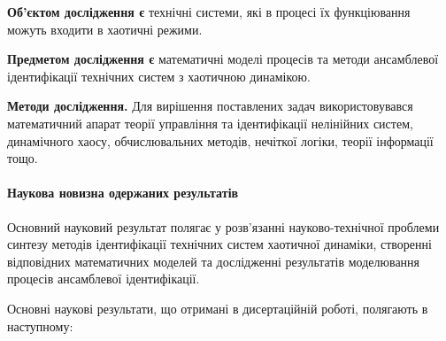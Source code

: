 \textbf{Об'єктом дослідження є}
технічні системи, які в процесі їх функціювання можуть
входити в хаотичні режими.

\smallskip
\textbf{Предметом дослідження є}
математичні моделі процесів та методи
ансамблевої ідентифікації технічних систем з хаотичною динамікою.

\smallskip
\textbf{Методи дослідження.}
Для вирішення поставлених задач використовувався математичний апарат
теорії управління та ідентифікації нелінійних систем, динамічного хаосу,
обчислювальних методів, нечіткої логіки, теорії інформації тощо.


\paragraph{Наукова новизна одержаних результатів}

Основний науковий результат полягає у розв'язанні науково-технічної проблеми
синтезу методів ідентифікації
технічних систем хаотичної динаміки, створенні відповідних математичних
моделей та дослідженні результатів моделювання процесів
ансамблевої ідентифікації.

Основні наукові результати, що отримані в дисертаційній роботі, полягають
в наступному:

